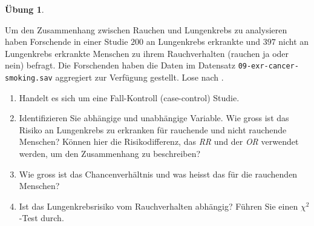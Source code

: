 \documentclass[
]{book}
\providecommand{\tightlist}{%
  \setlength{\itemsep}{0pt}\setlength{\parskip}{0pt}}
\theoremstyle{definition}
\theoremstyle{definition}
\theoremstyle{definition}
\newtheorem{exercise}{Übung}[chapter]
\theoremstyle{definition}
\theoremstyle{remark}
\begin{document}
\begin{exercise}
\protect\hypertarget{exr:cancer-smoking}{}\label{exr:cancer-smoking}\leavevmode

Um den Zusammenhang zwischen Rauchen und Lungenkrebs zu analysieren
haben Forschende in einer Studie \(200\) an Lungenkrebs erkrankte und
\(397\) nicht an Lungenkrebs erkrankte Menschen zu ihrem Rauchverhalten
(rauchen ja oder nein) befragt. Die Forschenden haben die Daten im
Datensatz \texttt{09-exr-cancer-smoking.sav} aggregiert zur
Verfügung gestellt. Lose nach \citet{matos1998}.

\begin{enumerate}
\def\labelenumi{\alph{enumi})}
\tightlist
\item
  Handelt es sich um eine Fall-Kontroll (case-control) Studie.
\item
  Identifizieren Sie abhängige und unabhängige Variable. Wie gross ist
  das Risiko an Lungenkrebs zu erkranken für rauchende und nicht
  rauchende Menschen? Können hier die Risikodifferenz, das \emph{RR} und
  der \emph{OR} verwendet werden, um den Zusammenhang zu beschreiben?
\item
  Wie gross ist das Chancenverhältnis und was heisst das für die
  rauchenden Menschen?
\item
  Ist das Lungenkrebsrisiko vom Rauchverhalten abhängig? Führen Sie einen \(\chi^2\)-Test durch.
\end{enumerate}

\end{exercise}
\end{document}
